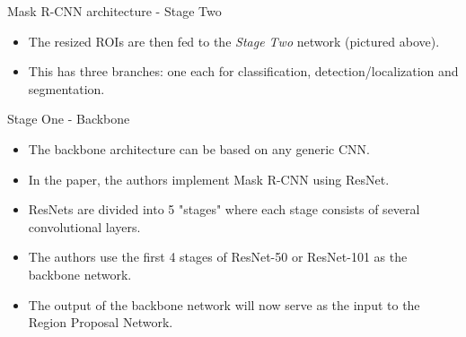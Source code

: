 \begin{frame} {Mask R-CNN architecture - Stage Two}
  \begin{figure}
    \centering
  \end{figure}
  \begin{itemize}
    \item The resized ROIs are then fed to the \textit{Stage Two} network (pictured above).
    \item This has three branches: one each for classification, detection/localization and segmentation.
  \end{itemize}
\end{frame}

\begin{frame} {Stage One - Backbone}
  \begin{itemize}
    \item The backbone architecture can be based on any generic CNN.
    \item In the paper, the authors implement Mask R-CNN using ResNet.
    \item ResNets are divided into 5 "stages" where each stage consists of several convolutional layers.
    \item The authors use the first 4 stages of ResNet-50 or ResNet-101 as the backbone network.
    \item The output of the backbone network will now serve as the input to the Region Proposal Network.
  \end{itemize}
\end{frame}

